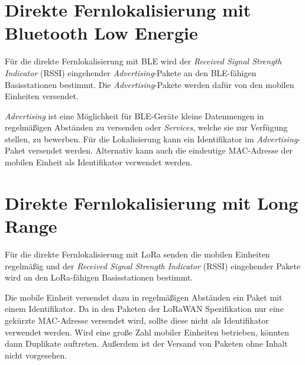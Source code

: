 \section{Direkte Fernlokalisierung mit Bluetooth Low Energie}
Für die direkte Fernlokalisierung mit BLE wird der \emph{Received Signal Strength Indicator} (RSSI) eingehender \emph{Advertising}-Pakete an den BLE-fähigen Basisstationen bestimmt.
Die \emph{Advertising}-Pakete werden dafür von den mobilen Einheiten versendet.

\emph{Advertising} ist eine Möglichkeit für BLE-Geräte kleine Datenmengen in regelmäßigen Abständen zu versenden oder \emph{Services}, welche sie zur Verfügung stellen, zu bewerben. 
Für die Lokalisierung kann ein Identifikator im \emph{Advertising}-Paket versendet werden.
Alternativ kann auch die eindeutige MAC-Adresse der mobilen Einheit als Identifikator verwendet werden.

\section{Direkte Fernlokalisierung mit Long Range}
Für die direkte Fernlokalisierung mit LoRa senden die mobilen Einheiten regelmäßig und der \emph{Received Signal Strength Indicator} (RSSI) eingehender Pakete wird an den LoRa-fähigen Basisstationen bestimmt.

Die mobile Einheit versendet dazu in regelmäßigen Abständen ein Paket mit einem Identifikator.
Da in den Paketen der LoRaWAN Spezifikation nur eine gekürzte MAC-Adresse versendet wird, sollte diese nicht als Identifikator verwendet werden.
Wird eine große Zahl mobiler Einheiten betrieben, könnten dann Duplikate auftreten.
Außerdem ist der Versand von Paketen ohne Inhalt nicht vorgesehen.
